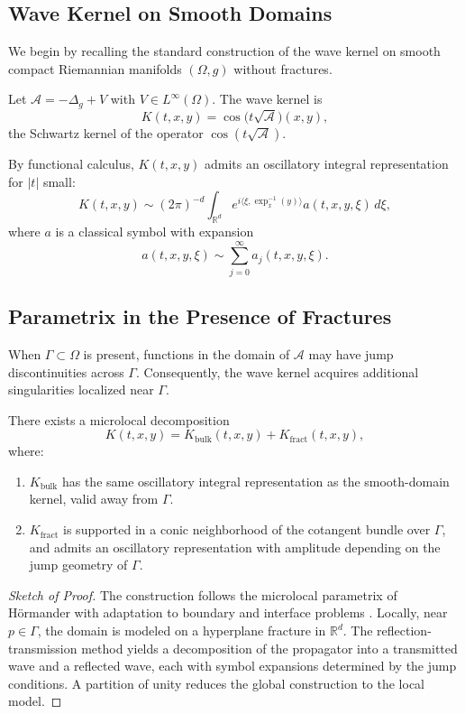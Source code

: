 \subsection{Wave Kernel on Smooth Domains}

We begin by recalling the standard construction of the wave kernel on smooth
compact Riemannian manifolds $(\Omega,g)$ without fractures.

\begin{definition}
Let $\mathcal{A} = -\Delta_g + V$ with $V \in L^\infty(\Omega)$.
The wave kernel is
\[
K(t,x,y) = \cos\!\big( t \sqrt{\mathcal{A}} \big)(x,y),
\]
the Schwartz kernel of the operator $\cos(t\sqrt{\mathcal{A}})$.
\end{definition}

By functional calculus, $K(t,x,y)$ admits an oscillatory integral
representation for $|t|$ small:
\[
K(t,x,y) \sim (2\pi)^{-d} \int_{\mathbb{R}^d} 
e^{i \langle \xi, \exp_x^{-1}(y)\rangle} 
a(t,x,y,\xi)\, d\xi,
\]
where $a$ is a classical symbol with expansion
\[
a(t,x,y,\xi) \sim \sum_{j=0}^\infty a_j(t,x,y,\xi).
\]

\subsection{Parametrix in the Presence of Fractures}

When $\Gamma \subset \Omega$ is present, functions in the domain of
$\mathcal{A}$ may have jump discontinuities across $\Gamma$. Consequently,
the wave kernel acquires additional singularities localized near $\Gamma$.

\begin{proposition}
\label{prop:fractured-parametrix}
There exists a microlocal decomposition
\[
K(t,x,y) = K_{\mathrm{bulk}}(t,x,y) + K_{\mathrm{fract}}(t,x,y),
\]
where:
\begin{enumerate}[label=(\roman*)]
  \item $K_{\mathrm{bulk}}$ has the same oscillatory integral representation as
  the smooth-domain kernel, valid away from $\Gamma$.
  \item $K_{\mathrm{fract}}$ is supported in a conic neighborhood of
  the cotangent bundle over $\Gamma$, and admits an oscillatory representation
  with amplitude depending on the jump geometry of $\Gamma$.
\end{enumerate}
\end{proposition}

\begin{proof}[Sketch of Proof]
The construction follows the microlocal parametrix of Hörmander
\cite{Hormander1994} with adaptation to boundary and interface problems
\cite{Melrose1993}. Locally, near $p \in \Gamma$, the domain is modeled
on a hyperplane fracture in $\mathbb{R}^d$. The reflection-transmission
method yields a decomposition of the propagator into a transmitted wave
and a reflected wave, each with symbol expansions determined by the jump
conditions. A partition of unity reduces the global construction to the
local model. 
\end{proof}

